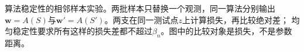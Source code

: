 算法稳定性的相邻样本实验。两批样本只替换一个观测，同一算法分别输出
  $\bm w=A(S)$与$\bm w'=A(S')$。两支在同一测试点$z$上计算损失，再比较绝对差；
  均匀稳定性要求所有这样的损失差都不超过$\beta_n$。图中的比较对象是损失，不是参数距离。
